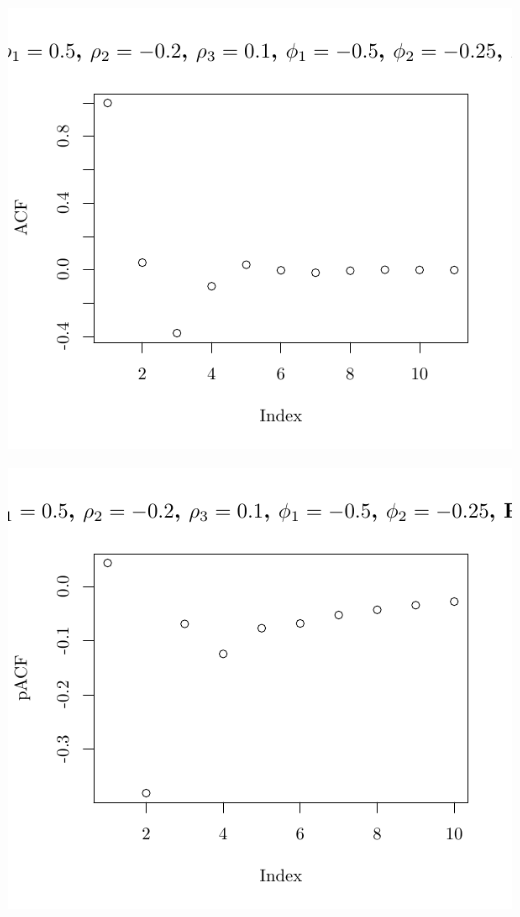 \documentclass[10pt]{paper}\usepackage[]{graphicx}\usepackage[]{color}
\makeatletter
\def\maxwidth{ %
  \ifdim\Gin@nat@width>\linewidth
    \linewidth
  \else
    \Gin@nat@width
  \fi
}
\newenvironment{knitrout}{}{} %
\makeatother
\begin{document}
\begin{knitrout}
{\centering \includegraphics[width=\maxwidth]{figure/graphics-plotter-185} 

}




{\centering \includegraphics[width=\maxwidth]{figure/graphics-plotter-186} 

}





\end{knitrout}
\end{document}
